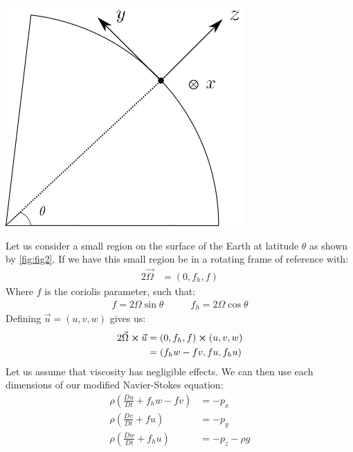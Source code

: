 \vspace{5mm}
\begin{minipage}{0.49\textwidth}
    \vspace{-2ex}
    \begin{center}
        \includegraphics[width=0.7\linewidth]{assets/figure-2.png}
        \label{fig:fig2}
    \end{center}
\end{minipage}\hspace{0.05\textwidth}
\begin{minipage}{0.49\textwidth}
    Let us consider a small region on the surface of the Earth at latitude $\theta$ as shown by \ref{fig:fig2}. If we have this small region be in a rotating frame of reference with:
    \begin{align*}
        2\vec{\Omega} &= \left(0,f_h,f\right)
    \end{align*}
    Where $f$ is the coriolis parameter, such that:
    \begin{align*}
        f = 2\Omega\sin\theta &\qquad f_h=2\Omega\cos\theta
    \end{align*}
    Defining $\vec{u}=(u,v,w)$ gives us:
    \begin{align*}
        2\vec{\Omega}\cross\vec{u} &= (0,f_h,f)\cross(u,v,w)\\
        &= (f_h w-fv,fu,f_h u)
    \end{align*}
    Let us assume that viscosity has negligible effects. We can then use each dimensions of our modified Navier-Stokes equation:
    \begin{align*}
        \rho \left(\frac{Du}{Dt}+f_hw-fv\right)&=-p_x\\
        \rho \left(\frac{Dv}{Dt}+fu\right)&=-p_y\\
        \rho\left(\frac{Dw}{Dt}+f_hu\right)&= -p_z-\rho g
    \end{align*}
\end{minipage}
